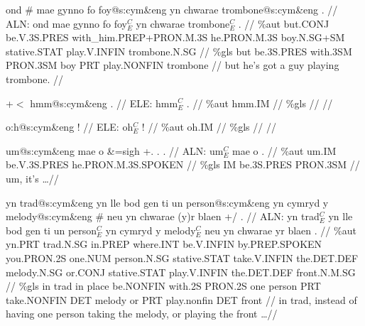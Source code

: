 \documentclass[a4paper,10pt]{article}
\begin{document}
\ex
\begingl[lingstyle=gergl]
\glchat ond \# mae gynno fo foy@s:cym\&eng yn chwarae trombone@s:cym\&eng . //
\glsurface ALN:  ond mae gynno fo foy$^{C}_{E}$ yn chwarae trombone$^{C}_{E}$ .  //
\glauto \%aut  but{\scriptsize .CONJ} be{\scriptsize .V.3S.PRES} with\_him{\scriptsize .PREP+PRON.M.3S} he{\scriptsize .PRON.M.3S} boy{\scriptsize .N.SG+SM} stative{\scriptsize .STAT} play{\scriptsize .V.INFIN} trombone{\scriptsize .N.SG}   //
\glmanual \%gls  but be{\scriptsize .3S.PRES} with{\scriptsize .3SM} PRON{\scriptsize .3SM} boy PRT play{\scriptsize .NONFIN} trombone   //
\gleng but he's got a guy playing trombone. //
\endgl
\xe

\ex
\begingl[lingstyle=gergl]
\glchat +$<$ hmm@s:cym\&eng . //
\glsurface ELE:  hmm$^{C}_{E}$ .  //
\glauto \%aut  hmm{\scriptsize .IM}   //
\glmanual \%gls     //
\gleng  //
\endgl
\xe

\ex
\begingl[lingstyle=gergl]
\glchat o:h@s:cym\&eng ! //
\glsurface ELE:  oh$^{C}_{E}$ !  //
\glauto \%aut  oh{\scriptsize .IM}   //
\glmanual \%gls     //
\gleng  //
\endgl
\xe

\ex
\begingl[lingstyle=gergl]
\glchat um@s:cym\&eng mae o \&=sigh +. . . //
\glsurface ALN:  um$^{C}_{E}$ mae o .  //
\glauto \%aut  um{\scriptsize .IM} be{\scriptsize .V.3S.PRES} he{\scriptsize .PRON.M.3S.SPOKEN}   //
\glmanual \%gls  IM be{\scriptsize .3S.PRES} PRON{\scriptsize .3SM}   //
\gleng um, it's \dots  //
\endgl
\xe

\ex
\begingl[lingstyle=gergl]
\glchat yn trad@s:cym\&eng yn lle bod gen ti un person@s:cym\&eng yn cymryd y melody@s:cym\&eng \# neu yn chwarae (y)r blaen +/ . //
\glsurface ALN:  yn trad$^{C}_{E}$ yn lle bod gen ti un person$^{C}_{E}$ yn cymryd y melody$^{C}_{E}$ neu yn chwarae yr blaen .  //
\glauto \%aut  yn{\scriptsize .PRT} trad{\scriptsize .N.SG} in{\scriptsize .PREP} where{\scriptsize .INT} be{\scriptsize .V.INFIN} by{\scriptsize .PREP.SPOKEN} you{\scriptsize .PRON.2S} one{\scriptsize .NUM} person{\scriptsize .N.SG} stative{\scriptsize .STAT} take{\scriptsize .V.INFIN} the{\scriptsize .DET.DEF} melody{\scriptsize .N.SG} or{\scriptsize .CONJ} stative{\scriptsize .STAT} play{\scriptsize .V.INFIN} the{\scriptsize .DET.DEF} front{\scriptsize .N.M.SG}   //
\glmanual \%gls  in trad in place be{\scriptsize .NONFIN} with{\scriptsize .2S} PRON{\scriptsize .2S} one person PRT take{\scriptsize .NONFIN} DET melody or PRT play{\scriptsize .nonfin} DET front   //
\gleng in trad, instead of having one person taking the melody, or playing the front \dots  //
\endgl
\xe
\end{document}
